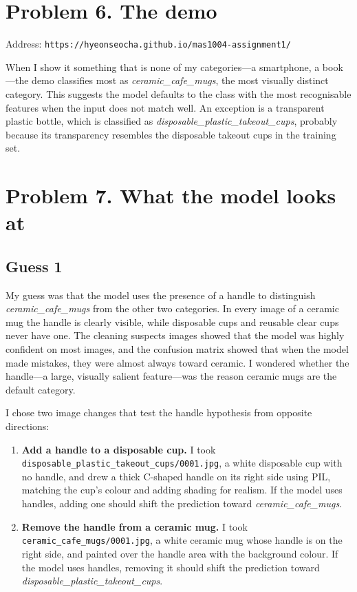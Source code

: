 \documentclass[11pt]{article}
\begin{document}
\section*{Problem 6. The demo}

Address: \texttt{https://hyeonseocha.github.io/mas1004-assignment1/}

When I show it something that is none of my categories---a smartphone, a book---the demo classifies most as \emph{ceramic\_cafe\_mugs}, the most visually distinct category. This suggests the model defaults to the class with the most recognisable features when the input does not match well. An exception is a transparent plastic bottle, which is classified as \emph{disposable\_plastic\_takeout\_cups}, probably because its transparency resembles the disposable takeout cups in the training set.

\section*{Problem 7. What the model looks at}

\subsection*{Guess 1}

My guess was that the model uses the presence of a handle to distinguish
\emph{ceramic\_cafe\_mugs} from the other two categories. In every image of
a ceramic mug the handle is clearly visible, while disposable cups and
reusable clear cups never have one. The cleaning suspects images showed that
the model was highly confident on most images, and the confusion matrix showed
that when the model made mistakes, they were almost always toward ceramic. I
wondered whether the handle---a large, visually salient feature---was the
reason ceramic mugs are the default category.

I chose two image changes that test the handle hypothesis from opposite directions:

\begin{enumerate}
  \item \textbf{Add a handle to a disposable cup.} I took
    \texttt{disposable\_plastic\_takeout\_cups/0001.jpg}, a white disposable
    cup with no handle, and drew a thick C-shaped handle on its right side
    using PIL, matching the cup's colour and adding shading for realism. If
    the model uses handles, adding one should shift the prediction toward
    \emph{ceramic\_cafe\_mugs}.
  \item \textbf{Remove the handle from a ceramic mug.} I took
    \texttt{ceramic\_cafe\_mugs/0001.jpg}, a white ceramic mug whose handle
    is on the right side, and painted over the handle area with the background
    colour. If the model uses handles, removing it should shift the prediction
    toward \emph{disposable\_plastic\_takeout\_cups}.
\end{enumerate}
\end{document}
